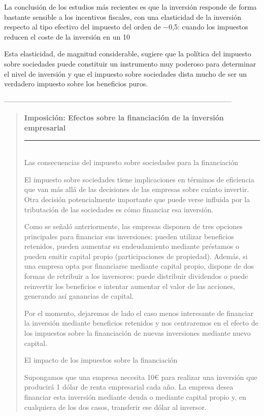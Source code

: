 \documentclass[10pt,a4paper]{article}
\newenvironment{specialblock}[1]{%
      \begin{quote} %
      \small %
      \noindent\textbf{#1}\\[-0.3em] %
      \rule{\linewidth}{0.4pt}\\[0.6em]}{
      \end{quote}}
\begin{document}
La conclusión de los estudios más recientes es que la inversión responde de forma bastante sensible a los incentivos fiscales, con una elasticidad de la inversión respecto al tipo efectivo del impuesto del orden de −0,5: cuando los impuestos reducen el coste de la inversión en un 10 %

Esta elasticidad, de magnitud considerable, sugiere que la política del impuesto sobre sociedades puede constituir un instrumento muy poderoso para determinar el nivel de inversión y que el impuesto sobre sociedades dista mucho de ser un verdadero impuesto sobre los beneficios puros.


------------------------------------------------------------------------------------------------

\begin{specialblock}{Imposición: Efectos sobre la financiación de la inversión empresarial}
    Las consecuencias del impuesto sobre sociedades para la financiación

    El impuesto sobre sociedades tiene implicaciones en términos de eficiencia que van más allá de las decisiones de las empresas sobre cuánto invertir. Otra decisión potencialmente importante que puede verse influida por la tributación de las sociedades es cómo financiar esa inversión.
    
    Como se señaló anteriormente, las empresas disponen de tres opciones principales para financiar sus inversiones: pueden utilizar beneficios retenidos, pueden aumentar su endeudamiento mediante préstamos o pueden emitir capital propio (participaciones de propiedad). Además, si una empresa opta por financiarse mediante capital propio, dispone de dos formas de retribuir a los inversores: puede distribuir dividendos o puede reinvertir los beneficios e intentar aumentar el valor de las acciones, generando así ganancias de capital.
    
    Por el momento, dejaremos de lado el caso menos interesante de financiar la inversión mediante beneficios retenidos y nos centraremos en el efecto de los impuestos sobre la financiación de nuevas inversiones mediante nuevo capital.
    
    El impacto de los impuestos sobre la financiación
    
    Supongamos que una empresa necesita 10€ para realizar una inversión que producirá 1 dólar de renta empresarial cada año. La empresa desea financiar esta inversión mediante deuda o mediante capital propio y, en cualquiera de los dos casos, transferir ese dólar al inversor.
    

\end{specialblock}
\end{document}
